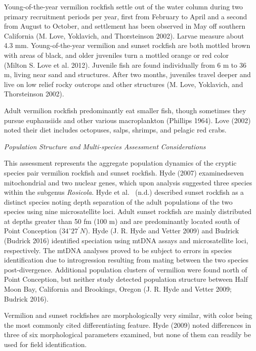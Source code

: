 \documentclass[
  english,
  a4paper,
]{article}
\begin{document}
Young-of-the-year vermilion rockfish settle out of the water column during two primary recruitment
periods per year, first from February to April and a second from August to October,
and settlement has been observed in May off southern California (M. Love, Yoklavich, and Thorsteinson 2002). Larvae
measure about 4.3 mm. Young-of-the-year vermilion and sunset rockfish are both mottled
brown with areas of black, and older juveniles turn a mottled orange or red color (Milton S. Love et al. 2012).
Juvenile fish are found individually from 6 m to 36 m, living near sand and structures.
After two months, juveniles travel deeper and live on low relief rocky outcrops and
other structures (M. Love, Yoklavich, and Thorsteinson 2002).

Adult vermilion rockfish predominantly eat smaller fish, though sometimes they pursue
euphausiids and other various macroplankton (Phillips 1964). Love (2002) noted
their diet includes octopuses, salps, shrimps, and pelagic red crabs.

\emph{Population Structure and Multi-species Assessment Considerations}

This assessment represents the aggregate population dynamics of the cryptic species pair vermilion rockfish
and sunset rockfish.
Hyde (2007) examinedseven mitochondrial and two nuclear genes, which upon analysis suggested
three species within the subgenus \emph{Rosicola}. Hyde et al.~
(n.d.) described sunset rockfish as a distinct species noting depth separation
of the adult populations of the two species using nine microsatellite loci.
Adult sunset rockfish are mainly distributed at depths
greater than 50 fm (100 m) and are predominantly located south of Point Conception ($34^\circ 27^\prime N$).
Hyde (J. R. Hyde and Vetter 2009) and Budrick (Budrick 2016) identified speciation using mtDNA assays and microsatellite loci,
respectively. The mtDNA analyses proved to be subject to errors in species identification due to introgression resulting from mating between the two species post-divergence.
Additional population clusters of vermilion were found north of Point Conception, but neither
study detected population structure between Half Moon Bay, California and Brookings,
Oregon (J. R. Hyde and Vetter 2009; Budrick 2016).

Vermilion and sunset rockfishes are morphologically very similar, with color being
the most commonly
cited differentiating feature. Hyde (2009) noted differences in three of six morphological
parameters examined, but none of them can readily be used for field identification.
\end{document}
